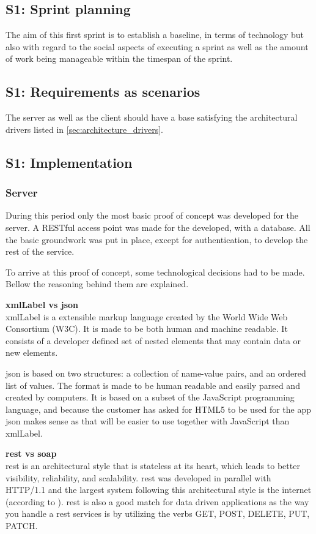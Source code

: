 \documentclass[11pt]{book}
\begin{document}
\subsection{S1: Sprint planning}
The aim of this first sprint is to establish a baseline, in terms of technology but also with regard to the social aspects of executing a sprint as well as the amount of work being manageable within the timespan of the sprint.

\subsection{S1: Requirements as scenarios}
The server as well as the client should have a base satisfying the architectural drivers listed in \ref{sec:architecture_drivers}.

\subsection{S1: Implementation}

\subsubsection{Server}
During this period only the most basic proof of concept was developed for the server. A RESTful access point was made for the developed, with a database. All the basic groundwork was put in place, except for authentication, to develop the rest of the service.

To arrive at this proof of concept, some technological decisions had to be made. Bellow the reasoning behind them are explained.

\textbf{\gls{xmlLabel} vs \gls{json}}\\
\gls{xmlLabel} is a extensible markup language created by the World Wide Web Consortium (W3C). It is made to be both human and machine readable. It consists of a developer defined set of nested elements that may contain data or new elements.

\gls{json} \cite{json} is based on two structures: a collection of name-value pairs, and an ordered list of values. The format is made to be human readable and easily parsed and created by computers. It is based on a subset of the JavaScript programming language, and because the customer has asked for HTML5 to be used for the app \gls{json} makes sense as that will be easier to use together with JavaScript than \gls{xmlLabel}.

\textbf{\gls{rest} vs \gls{soap}}\\
\gls{rest} \cite{rest} is an architectural style that is stateless at its heart, which leads to better visibility, reliability, and scalability. \gls{rest} was developed in parallel with HTTP/1.1 and the largest system following this architectural style is the internet (according to \cite{wikipedia:rest}). \gls{rest} is also a good match for data driven applications as the way you handle a \gls{rest} services is by utilizing the verbs GET, POST, DELETE, PUT, PATCH.
\end{document}
